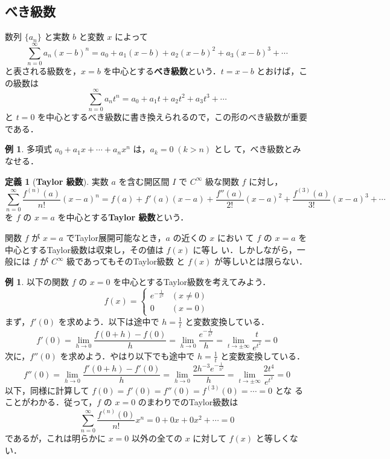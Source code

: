\documentclass[10pt, uplatex, dvipdfmx]{jsarticle}
\theoremstyle{definition}
\newtheorem*{definition}{定義}
\newtheorem{example}[theorem]{例}
\numberwithin{equation}{section}
\begin{document}
\subsection{べき級数}

数列 $\{a_n\}$ と実数 $b$ と変数 $x$ によって
\[
  \sum_{n=0}^{\infty} a_n(x-b)^n = a_0 + a_1(x-b) + a_2(x-b)^2 + a_3(x-b)^3 + \cdots
\]
と表される級数を，$x=b$ を中心とする\textbf{べき級数}という．$t=x-b$ とおけば，この級数は
\[
  \sum_{n=0}^{\infty} a_n t^n = a_0 + a_1 t + a_2 t^2 + a_3 t^3  + \cdots
\]
と $t=0$ を中心とするべき級数に書き換えられるので，この形のべき級数が重要である．

\begin{example}
  多項式 $a_0 + a_1 x + \cdots +a_n x^n$ は，$a_{k} = 0 \; (k >n)$ とし
  て，べき級数とみなせる．
\end{example}

\begin{definition}[\textbf{Taylor 級数}]
  実数 $a$ を含む開区間 $I$ で $C^{\infty}$ 級な関数 $f$ に対し，
  \[
    \sum_{n=0}^{\infty} \frac{f^{(n)}(a)}{n!}(x-a)^n = f(a) + f'(a)(x-a) + \frac{f''(a)}{2!}(x-a)^2
    + \frac{f^{(3)}(a)}{3!}(x-a)^3 + \cdots
  \]
  を $f$ の $x=a$ を中心とする\textbf{Taylor 級数}という．
\end{definition}

関数 $f$ が $x=a$ でTaylor展開可能なとき，$a$ の近くの $x$ におい
て $f$ の $x=a$ を中心とするTaylor級数は収束し，その値は $f(x)$ に等し
い．しかしながら，一般には $f$ が $C^{\infty}$ 級であってもそのTaylor級数
と $f(x)$ が等しいとは限らない．

\begin{example}
  以下の関数 $f$ の $x=0$ を中心とするTaylor級数を考えてみよう．
  \[
    f(x) =\left\{
      \begin{array}{cc}
        e^{-\frac{1}{x^2}} & (x \neq 0)\\
        0 & (x=0)
      \end{array}
    \right.
  \]
  まず，$f'(0)$ を求めよう．以下は途中で $h=\frac{1}{t}$ と変数変換している．
  \[
    f'(0)=\lim_{h \to 0} \frac{f(0+h)-f(0)}{h} = \lim_{h \to 0} \frac{e^{-\frac{1}{h^2}}}{h}
    = \lim_{t \to \pm \infty} \frac{t}{e^{t^2}} = 0
  \]
  次に，$f''(0)$ を求めよう．やはり以下でも途中で $h=\frac{1}{t}$ と変数変換している．
  \[
    f''(0) = \lim_{h \to 0} \frac{f'(0+h)-f'(0)}{h} = \lim_{h \to 0} \frac{2h^{-3}e^{-\frac{1}{h^2}}}{h}
    =\lim_{t \to \pm \infty} \frac{2t^4}{e^{t^2}} =0
  \]
  以下，同様に計算して $f(0)=f'(0)=f''(0)= f^{(3)}(0)= \cdots = 0$ とな
  ることがわかる．従って，$f$ の $x=0$ のまわりでのTaylor級数は
  \[
    \sum_{n=0}^{\infty} \frac{f^{(n)}(0)}{n!}x^n = 0 + 0x + 0x^2 + \cdots = 0
  \]
  であるが，これは明らかに $x=0$ 以外の全ての $x$ に対して $f(x)$ と等しくない．
\end{example}
\end{document}
